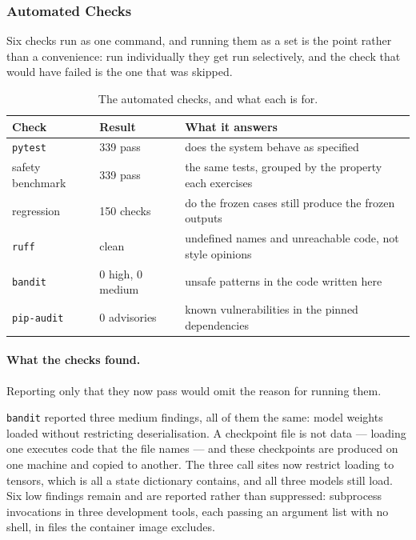 \subsubsection{Automated Checks}

Six checks run as one command, and running them as a set is the point rather than a
convenience: run individually they get run selectively, and the check that would have failed is
the one that was skipped.

\begin{table}[H]
  \centering
  \small
  \begin{tabularx}{\linewidth}{llX}
    \toprule
    \textbf{Check} & \textbf{Result} & \textbf{What it answers} \\
    \midrule
    \texttt{pytest} & 339 pass & does the system behave as specified \\
    safety benchmark & 339 pass & the same tests, grouped by the property each exercises \\
    regression & 150 checks & do the frozen cases still produce the frozen outputs \\
    \texttt{ruff} & clean & undefined names and unreachable code, not style opinions \\
    \texttt{bandit} & 0 high, 0 medium & unsafe patterns in the code written here \\
    \texttt{pip-audit} & 0 advisories & known vulnerabilities in the pinned dependencies \\
    \bottomrule
  \end{tabularx}
  \caption{The automated checks, and what each is for.}
  \label{tab:checks}
\end{table}

\paragraph{What the checks found.} Reporting only that they now pass would omit the reason for
running them.

\texttt{bandit} reported three medium findings, all of them the same: model weights loaded
without restricting deserialisation. A checkpoint file is not data --- loading one executes
code that the file names --- and these checkpoints are produced on one machine and copied to
another. The three call sites now restrict loading to tensors, which is all a state dictionary
contains, and all three models still load. Six low findings remain and are reported rather than
suppressed: subprocess invocations in three development tools, each passing an argument list
with no shell, in files the container image excludes.

